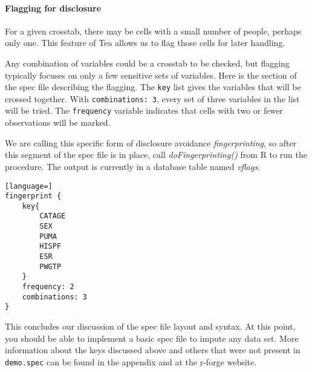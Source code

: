 \documentclass{article}
\begin{document}
\paragraph{Flagging for disclosure} For a given crosstab, there may be cells with a
small number of people, perhaps only one. This feature of Tea allows us to flag those
cells for later handling.

Any combination of variables could be a crosstab to be checked, but flagging
typically focuses on only a few sensitive sets of variables. Here is the section
of the spec file describing the flagging. The {\tt key} list gives the variables
that will be crossed together. With {\tt combinations: 3}, every set of three
variables in the list will be tried. The {\tt frequency} variable indicates that
cells with two or fewer observations will be marked.

We are calling this specific form of disclosure avoidance {\em fingerprinting}, so after
this segment of the spec file is in place, call {\em doFingerprinting()} from R to run the
procedure. The output is currently in a database table named {\em vflags}.

\begin{lstlisting}[language=]
fingerprint {
    key{
        CATAGE
        SEX
        PUMA
        HISPF
        ESR
        PWGTP
    }
    frequency: 2
    combinations: 3
}
\end{lstlisting}


This concludes our discussion of the spec file layout and syntax. At this point, you should be 
able to implement a basic spec file to impute any data set. More information about the keys 
discussed above and others that were not present in {\tt demo.spec} can be found in the appendix and 
at the r-forge website.
\end{document}
